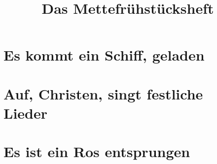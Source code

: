\documentclass[10pt]{article}
\title{Das Mettefrühstücksheft}
\begin{document}
\maketitle
\newpage
\tableofcontents
\newpage
\section{Es kommt ein Schiff, geladen}

\section{Auf, Christen, singt festliche Lieder}

\section{Es ist ein Ros entsprungen}
\end{document}
